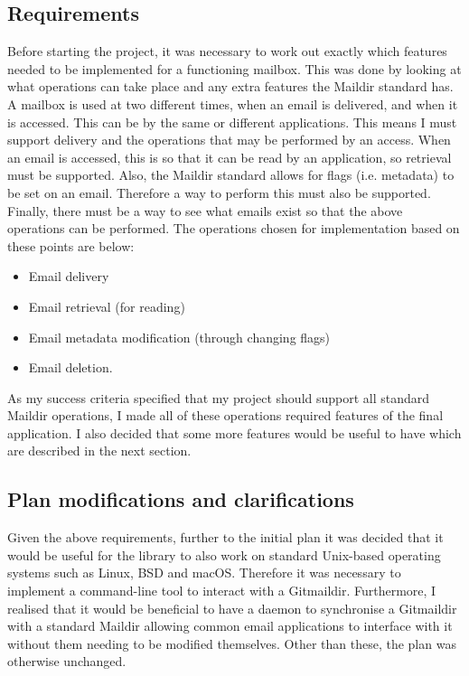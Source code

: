 \subsection{Requirements}

Before starting the project, it was necessary to work out exactly which features needed to be implemented for a functioning mailbox. This was done by looking at what operations can take place and any extra features the Maildir standard has. A mailbox is used at two different times, when an email is delivered, and when it is accessed. This can be by the same or different applications. This means I must support delivery and the operations that may be performed by an access. When an email is accessed, this is so that it can be read by an application, so retrieval must be supported. Also, the Maildir standard allows for flags (i.e. metadata) to be set on an email. Therefore a way to perform this must also be supported. Finally, there must be a way to see what emails exist so that the above operations can be performed. The operations chosen for implementation based on these points are below:

\begin{itemize}
  \item Email delivery
  \item Email retrieval (for reading)
  \item Email metadata modification (through changing flags)
  \item Email deletion.
\end{itemize}

As my success criteria specified that my project should support all standard Maildir operations, I made all of these operations required features of the final application. I also decided that some more features would be useful to have which are described in the next section.

\subsection{Plan modifications and clarifications}

Given the above requirements, further to the initial plan it was decided that it would be useful for the library to also work on standard Unix-based operating systems such as Linux, BSD and macOS. Therefore it was necessary to implement a command-line tool to interact with a Gitmaildir. Furthermore, I realised that it would be beneficial to have a daemon to synchronise a Gitmaildir with a standard Maildir allowing common email applications to interface with it without them needing to be modified themselves. Other than these, the plan was otherwise unchanged.

